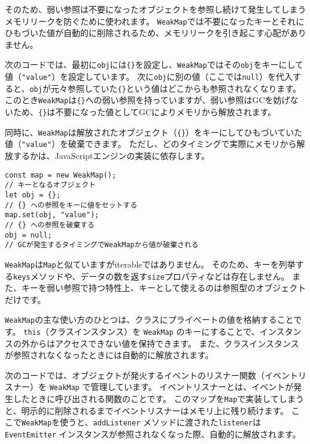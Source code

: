 そのため、弱い参照は不要になったオブジェクトを参照し続けて発生してしまうメモリリークを防ぐために使われます。
\texttt{WeakMap}では不要になったキーとそれにひもづいた値が自動的に削除されるため、メモリリークを引き起こす心配がありません。

次のコードでは、最初に\texttt{obj}には\texttt{\{\}}を設定し、\texttt{WeakMap}ではその\texttt{obj}をキーにして値（\texttt{"value"}）を設定しています。
次に\texttt{obj}に別の値（ここでは\texttt{null}）を代入すると、\texttt{obj}が元々参照していた\texttt{\{\}}という値はどこからも参照されなくなります。
このとき\texttt{WeakMap}は\texttt{\{\}}への弱い参照を持っていますが、弱い参照はGCを妨げないため、\texttt{\{\}}は不要になった値としてGCによりメモリから解放されます。

同時に、\texttt{WeakMap}は解放されたオブジェクト（\texttt{\{\}}）をキーにしてひもづいていた値（\texttt{"value"}）を破棄できます。
ただし、どのタイミングで実際にメモリから解放するかは、JavaScriptエンジンの実装に依存します。

\begin{lstlisting}
const map = new WeakMap();
// キーとなるオブジェクト
let obj = {};
// {} への参照をキーに値をセットする
map.set(obj, "value");
// {} への参照を破棄する
obj = null;
// GCが発生するタイミングでWeakMapから値が破棄される
\end{lstlisting}

\texttt{WeakMap}は\texttt{Map}と似ていますがiterableではありません。
そのため、キーを列挙する\texttt{keys}メソッドや、データの数を返す\texttt{size}プロパティなどは存在しません。
また、キーを弱い参照で持つ特性上、キーとして使えるのは参照型のオブジェクトだけです。

\texttt{WeakMap}の主な使い方のひとつは、クラスにプライベートの値を格納することです。
\texttt{this}（クラスインスタンス）を
\texttt{WeakMap}
のキーにすることで、インスタンスの外からはアクセスできない値を保持できます。
また、クラスインスタンスが参照されなくなったときには自動的に解放されます。

次のコードでは、オブジェクトが発火するイベントのリスナー関数（イベントリスナー）を
\texttt{WeakMap} で管理しています。
イベントリスナーとは、イベントが発生したときに呼び出される関数のことです。
このマップを\texttt{Map}で実装してしまうと、明示的に削除されるまでイベントリスナーはメモリ上に残り続けます。
ここで\texttt{WeakMap}を使うと、\texttt{addListener}
メソッドに渡された\texttt{listener}は
\texttt{EventEmitter}
インスタンスが参照されなくなった際、自動的に解放されます。

